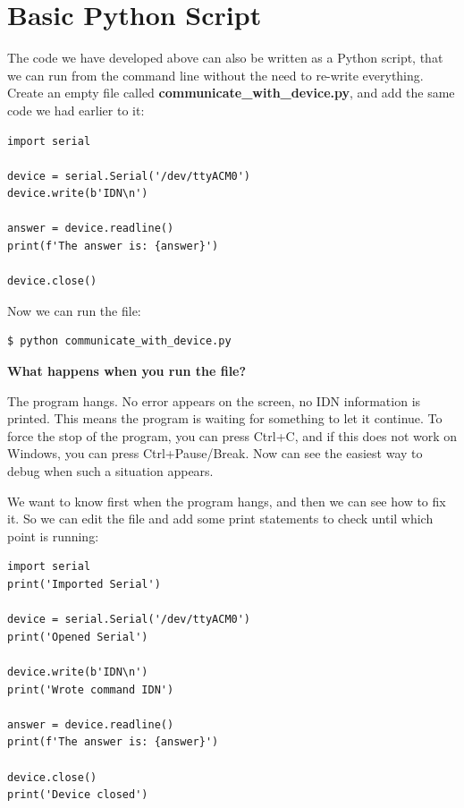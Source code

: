\section{Basic Python Script}
The code we have developed above can also be written as a Python script, that we can run from the command line without the need to re-write everything. Create an empty file called \textbf{communicate\_with\_device.py}, and add the same code we had earlier to it:

\begin{verbatim}
import serial

device = serial.Serial('/dev/ttyACM0')
device.write(b'IDN\n')

answer = device.readline()
print(f'The answer is: {answer}')

device.close()
\end{verbatim}

Now we can run the file:

\begin{verbatim}
$ python communicate_with_device.py
\end{verbatim}


\textbf{What happens when you run the file?}

The program hangs. No error appears on the screen, no IDN information is printed. This means the program is waiting for something to let it continue. To force the stop of the program, you can press Ctrl+C, and if this does not work on Windows, you can press Ctrl+Pause/Break. Now can see the easiest way to debug when such a situation appears.

We want to know first when the program hangs, and then we can see how to fix it. So we can edit the file and add some print statements to check until which point is running:

\begin{verbatim}
import serial
print('Imported Serial')

device = serial.Serial('/dev/ttyACM0')
print('Opened Serial')

device.write(b'IDN\n')
print('Wrote command IDN')

answer = device.readline()
print(f'The answer is: {answer}')

device.close()
print('Device closed')
\end{verbatim}


